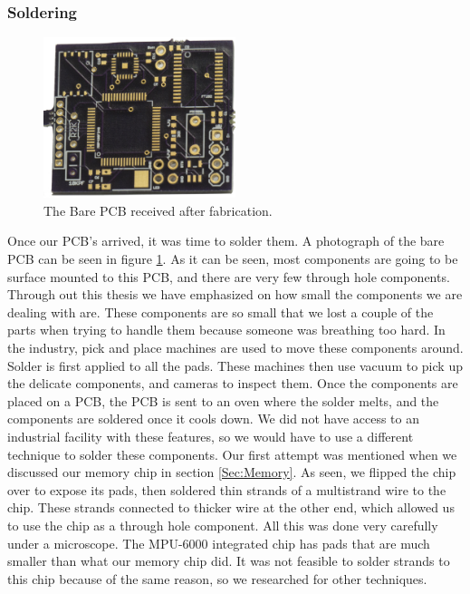 \subsubsection{Soldering}
\label{Sec:Soldering}
\begin{figure}
\begin{center}
\includegraphics[width=0.5\textwidth]{images/BarePCB.jpg}
\caption{The Bare PCB received after fabrication.}
\label{Fig:PCBBare}
\end{center}
\end{figure}
Once our PCB's arrived, it was time to solder them.
A photograph of the bare PCB can be seen in figure \ref{Fig:PCBBare}.
As it can be seen,
most components are going to be surface mounted to this PCB,
and there are very few through hole components.
Through out this thesis we have emphasized on how small the components we are dealing with are.
These components are so small that we lost a couple of the parts when trying to handle them because someone was breathing too hard.
In the industry,
pick and place machines are used to move these components around.
Solder is first applied to all the pads.
These machines then use vacuum to pick up the delicate components,
and cameras to inspect them. 
Once the components are placed on a PCB,
the PCB is sent to an oven where the solder melts,
and the components are soldered once it cools down.
We did not have access to an industrial facility with these features,
so we would have to use a different technique to solder these components.
Our first attempt was mentioned when we discussed our memory chip in section \ref{Sec:Memory}.
As seen, we flipped the chip over to expose its pads,
then soldered thin strands of a multistrand wire to the chip.
These strands connected to thicker wire at the other end,
which allowed us to use the chip as a through hole component.
All this was done very carefully under a microscope.
The MPU-6000 integrated chip has pads that are much smaller than what our memory chip did.
It was not feasible to solder strands to this chip because of the same reason,
so we researched for other techniques.

